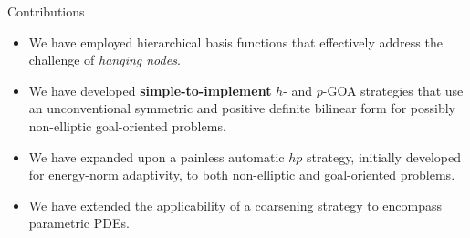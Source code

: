 \begin{frame}{Contributions}

\begin{itemize}
\item We have employed hierarchical basis functions that effectively address the challenge of \emph{hanging nodes}.
\vspace{0.3cm}
\item We have developed \textbf{simple-to-implement} \( h \)- and \( p \)-GOA strategies that use an unconventional symmetric and positive definite bilinear form for possibly non-elliptic goal-oriented problems.
\vspace{0.3cm}
\item We have expanded upon a painless automatic \( hp \) strategy, initially developed for energy-norm adaptivity, to both non-elliptic and goal-oriented problems.
\vspace{0.3cm}
\item We have extended the applicability of a coarsening strategy to encompass parametric PDEs.
\vspace{0.3cm}
\end{itemize}

\end{frame}
